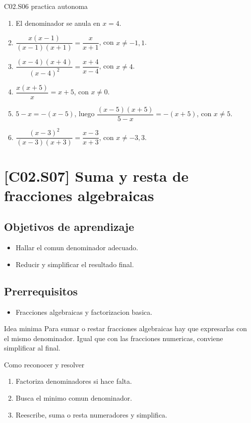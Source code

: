 \begin{fullsolution}{C02.S06 practica autonoma}
\begin{enumerate}[label=\textbf{PX-C02.S06-\arabic*:}, leftmargin=*]
  \item El denominador se anula en \(x=4\).
  \item \(\dfrac{x(x-1)}{(x-1)(x+1)}=\dfrac{x}{x+1}\), con \(x\neq -1,1\).
  \item \(\dfrac{(x-4)(x+4)}{(x-4)^2}=\dfrac{x+4}{x-4}\), con \(x\neq 4\).
  \item \(\dfrac{x(x+5)}{x}=x+5\), con \(x\neq 0\).
  \item \(5-x=-(x-5)\), luego \(\dfrac{(x-5)(x+5)}{5-x}=-(x+5)\), con \(x\neq 5\).
  \item \(\dfrac{(x-3)^2}{(x-3)(x+3)}=\dfrac{x-3}{x+3}\), con \(x\neq -3,3\).
\end{enumerate}
\end{fullsolution}

\section{[C02.S07] Suma y resta de fracciones algebraicas}

\subsection*{Objetivos de aprendizaje}
\begin{itemize}
  \item Hallar el comun denominador adecuado.
  \item Reducir y simplificar el resultado final.
\end{itemize}

\subsection*{Prerrequisitos}
\begin{itemize}
  \item Fracciones algebraicas y factorizacion basica.
\end{itemize}

\begin{theorybox}{Idea minima}
Para sumar o restar fracciones algebraicas hay que expresarlas con el mismo denominador. Igual
que con las fracciones numericas, conviene simplificar al final.
\end{theorybox}

\begin{methodbox}{Como reconocer y resolver}
\begin{enumerate}
  \item Factoriza denominadores si hace falta.
  \item Busca el minimo comun denominador.
  \item Reescribe, suma o resta numeradores y simplifica.
\end{enumerate}
\end{methodbox}


